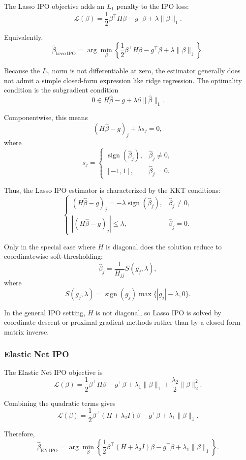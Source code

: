 \documentclass{article}
\begin{document}
The Lasso IPO objective adds an \(L_1\) penalty to the IPO loss:
\[
\mathcal L(\beta)
=
\frac{1}{2}\beta^\top H\beta
-
g^\top \beta
+
\lambda \|\beta\|_1.
\]

Equivalently,
\[
\hat\beta_{\mathrm{lasso\ IPO}}
=
\arg\min_{\beta}
\left\{
\frac{1}{2}\beta^\top H\beta
-
g^\top \beta
+
\lambda \|\beta\|_1
\right\}.
\]

Because the \(L_1\) norm is not differentiable at zero, the estimator generally
does not admit a simple closed-form expression like ridge regression. The
optimality condition is the subgradient condition
\[
0 \in H\hat\beta - g + \lambda \partial \|\hat\beta\|_1.
\]

Componentwise, this means
\[
(H\hat\beta - g)_j
+
\lambda s_j
=
0,
\]
where
\[
s_j =
\begin{cases}
\operatorname{sign}(\hat\beta_j), & \hat\beta_j \neq 0,\\
[-1,1], & \hat\beta_j = 0.
\end{cases}
\]

Thus, the Lasso IPO estimator is characterized by the KKT conditions:
\[
\boxed{
\begin{cases}
(H\hat\beta - g)_j = -\lambda \operatorname{sign}(\hat\beta_j),
& \hat\beta_j \neq 0,\\[4pt]
|(H\hat\beta - g)_j| \leq \lambda,
& \hat\beta_j = 0.
\end{cases}
}
\]

Only in the special case where \(H\) is diagonal does the solution reduce to
coordinatewise soft-thresholding:
\[
\hat\beta_j
=
\frac{1}{H_{jj}}
S(g_j,\lambda),
\]
where
\[
S(g_j,\lambda)
=
\operatorname{sign}(g_j)
\max\{|g_j|-\lambda,0\}.
\]

In the general IPO setting, \(H\) is not diagonal, so Lasso IPO is solved by
coordinate descent or proximal gradient methods rather than by a closed-form
matrix inverse.

\subsubsection{Elastic Net IPO}

The Elastic Net IPO objective is
\[
\mathcal L(\beta)
=
\frac{1}{2}\beta^\top H\beta
-
g^\top \beta
+
\lambda_1\|\beta\|_1
+
\frac{\lambda_2}{2}\|\beta\|_2^2.
\]

Combining the quadratic terms gives
\[
\mathcal L(\beta)
=
\frac{1}{2}\beta^\top (H+\lambda_2 I)\beta
-
g^\top \beta
+
\lambda_1\|\beta\|_1.
\]

Therefore,
\[
\hat\beta_{\mathrm{EN\ IPO}}
=
\arg\min_{\beta}
\left\{
\frac{1}{2}\beta^\top (H+\lambda_2 I)\beta
-
g^\top \beta
+
\lambda_1\|\beta\|_1
\right\}.
\]
\end{document}
